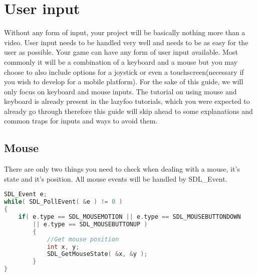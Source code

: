 \documentclass[11pt,fleqn]{book} %
\begin{document}
\chapter{User input} %
Without any form of input, your project will be basically nothing more than a video. User input needs to be handled very well and needs to be as easy for the user as possible. Your game can have any form of user input available. Most commonly it will be a combination of a keyboard and a mouse but you may choose to also include options for a joystick or even a touchscreen(necessary if you wish to develop for a mobile platform). For the sake of this guide, we will only focus on keyboard and mouse inputs. The tutorial on using mouse and keyboard is already present in the lazyfoo tutorials, which you were expected to already go through therefore this guide will skip ahead to some explanations and common traps for inputs and ways to avoid them.
    \section{Mouse}
    There are only two things you need to check when dealing with a mouse, it's state and it's position. All mouse events will be handled by SDL\_Event.
    \begin{lstlisting}[language=C++, caption=Getting mouse state]
SDL_Event e;
while( SDL_PollEvent( &e ) != 0 )
{
    if( e.type == SDL_MOUSEMOTION || e.type == SDL_MOUSEBUTTONDOWN
        || e.type == SDL_MOUSEBUTTONUP )
        {
            //Get mouse position
            int x, y;
            SDL_GetMouseState( &x, &y );
        }
}
\end{lstlisting}
\end{document}
